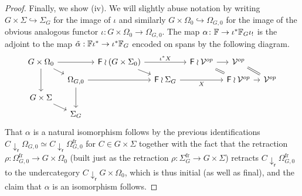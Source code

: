 \documentclass[a4paper,10pt]{article}%
\begin{document}
\begin{proof}
Finally, we show (iv). We will slightly abuse notation by writing 
$G \times \Sigma \hookrightarrow \Sigma_G$ for the image of $\iota$
and similarly
$G \times \Omega_0 \hookrightarrow \Omega_{G,0}$ for the image of the obvious analogous functor
$\iota \colon G \times \Omega_0 \to \Omega_{G,0}$.
The map 
$\alpha \colon \mathbb{F} \to \iota^{\**} \mathbb{F}_G \iota_{!}$
is the adjoint to the map 
$\tilde \alpha: \mathbb{F} \iota^{\**} \to \iota^{\**} \mathbb{F}_G$ encoded on spans by the following diagram.
\begin{equation}\label{MONADEQUIV DEF}
\begin{tikzcd}[row sep=5pt, column sep =8pt]
	G \times \Omega_0	\ar{dd} \ar{rd} \ar{rr} &&
	\Fin \wr (G \times \Sigma_0) \ar{rd}  \ar{rr}{\iota^{\**} X}&&
	\Fin \wr \mathcal{V}^{op} \ar{r} \ar[equal]{rd}&
	\mathcal{V}^{op} \ar[equal]{rd}
\\
	& \Omega_{G,0} \ar{dd} \ar{rr} &&
	\Fin \wr \Sigma_G  \ar{rr}[swap]{X} &&
	\Fin \wr \mathcal{V}^{op} \ar{r} &
	\mathcal{V}^{op}
\\
	G \times \Sigma \ar{rd} 
\\
	& \Sigma_G
\end{tikzcd}
\end{equation}
That 
$\alpha$
is a natural isomorphism
follows by the previous identifications 
$C \downarrow_{\mathsf{r}} \Omega_{G,0} \simeq
C \downarrow_{\mathsf{r}} \Omega_{G,0}^{\text{fr}}$
for $C \in G \times \Sigma$
together with the fact that the retraction 
$\rho \colon \Omega_{G,0}^{\text{fr}} \to G \times \Omega_0$
(built just as the retraction
$\rho \colon \Sigma_G^{\text{fr}} \to G \times \Sigma$)
retracts 
$C \downarrow_{\mathsf{r}} \Omega_{G,0}^{\text{fr}}$
to the undercategory
$C \downarrow_{\mathsf{r}} G \times \Omega_0$, which is thus initial (as well as final), and the claim that $\alpha$ is an isomorphism follows.


\end{proof}
\end{document}
